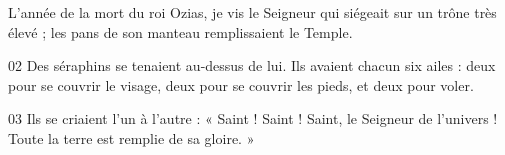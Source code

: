 L’année de la mort du roi Ozias, je vis le Seigneur qui siégeait sur un trône très élevé ; les pans de son manteau remplissaient le Temple.

02 Des séraphins se tenaient au-dessus de lui. Ils avaient chacun six ailes : deux pour se couvrir le visage, deux pour se couvrir les pieds, et deux pour voler.

03 Ils se criaient l’un à l’autre : « Saint ! Saint ! Saint, le Seigneur de l’univers ! Toute la terre est remplie de sa gloire. »
